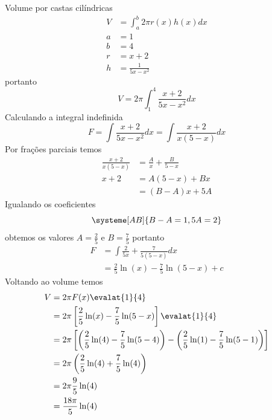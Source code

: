 \documentclass[a4paper,12pt,fleqn]{article}
\begin{document}
\begin{answer}
  Volume por castas cilíndricas
  \begin{align*}
    V & = \int_a^b 2\pi r(x) h(x) dx \\
    a & = 1 \\
    b & = 4 \\
    r & = x+2 \\
    h & = \frac{1}{5x-x^2}
  \end{align*}
  portanto
  \[
    V = 2\pi \int_1^4 \frac{x+2}{5x-x^2} dx
  \]
  Calculando a integral indefinida
  \[
    F = \int \frac{x+2}{5x-x^2} dx = \int \frac{x+2}{x(5-x)} dx
  \]
  Por frações parciais temos
  \begin{align*}
    \frac{x+2}{x(5-x)} & = \frac{A}{x} + \frac{B}{5-x} \\
    x+2                & = A(5-x) + Bx                 \\
    & = (B-A)x + 5A
  \end{align*}
  Igualando os coeficientes
  \[
    \systeme[AB]{B-A=1,5A=2}
  \]
  obtemos os valores
  \(A=\frac{2}{5}\) e
  \(B=\frac{7}{5}\)
  portanto
  \begin{align*}
    F & = \int \frac{2}{5x} + \frac{7}{5(5-x)} dx \\
      & = \frac{2}{5}\ln(x) - \frac{7}{5}\ln(5-x) + c
  \end{align*}
  Voltando ao volume temos
  \begin{align*}
    V
    & = 2\pi F(x)\evalat{1}{4} \\
    & = 2\pi \left[\frac{2}{5}\ln(x) - \frac{7}{5}\ln(5-x)\right] \evalat{1}{4} \\
    & = 2\pi \left[
      \left(\frac{2}{5}\ln(4) - \frac{7}{5}\ln(5-4)\right)
    - \left(\frac{2}{5}\ln(1) - \frac{7}{5}\ln(5-1)\right)
    \right] \\
    & = 2\pi \left(\frac{2}{5}\ln(4) + \frac{7}{5}\ln(4)\right) \\
    & = 2\pi \frac{9}{5}\ln(4) \\
    & = \frac{18\pi}{5} \ln(4)
  \end{align*}
\end{answer}

\end{document}
